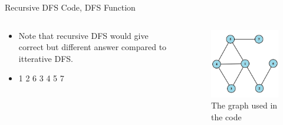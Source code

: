 \documentclass[aspectratio=169]{beamer}%
\begin{document}
\begin{frame}{Recursive DFS Code, DFS Function}
    \begin{columns}
        \begin{column}{0.70\textwidth}
            
            \begin{itemize}
                \item Note that recursive DFS would give correct but different answer compared to itterative DFS.
                \item 1 2 6 3 4 5 7
            \end{itemize}
        \end{column}
        \hfill
        \begin{column}{0.25\textwidth}
            \begin{figure}
                \centering
                \includegraphics[width = .9\linewidth]{dfs 21.png}
                \caption{The graph used in the code}
            \end{figure}
        \end{column}
    \end{columns}
\end{frame}
\end{document}
